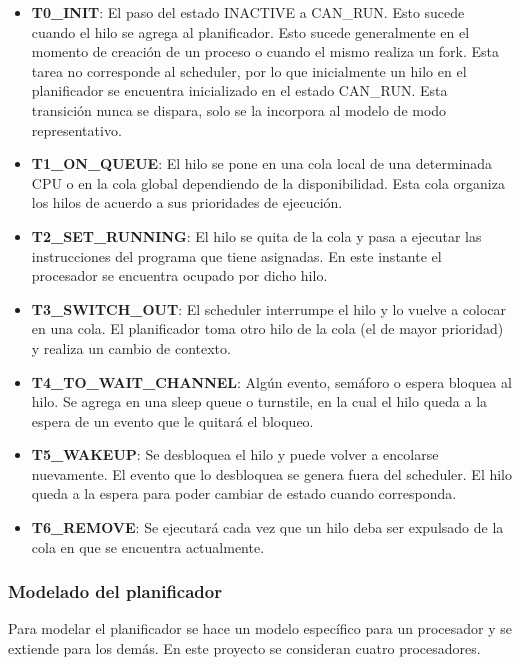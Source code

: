 \begin{itemize}
    \item \textbf{T0\_INIT}: El paso del estado INACTIVE a CAN\_RUN. Esto sucede cuando el hilo se agrega al planificador. Esto sucede generalmente en el momento de creación de un proceso o cuando el mismo realiza un fork. Esta tarea no corresponde al scheduler, por lo que inicialmente un hilo en el planificador se encuentra inicializado en el estado CAN\_RUN. Esta transición nunca se dispara, solo se la incorpora al modelo de modo representativo.
    \item \textbf{T1\_ON\_QUEUE}: El hilo se pone en una cola local de una determinada CPU o en la cola global dependiendo de la disponibilidad. Esta cola organiza los hilos de acuerdo a sus prioridades de ejecución.
    \item \textbf{T2\_SET\_RUNNING}: El hilo se quita de la cola y pasa a ejecutar las instrucciones del programa que tiene asignadas. En este instante el procesador se encuentra ocupado por dicho hilo.
    \item \textbf{T3\_SWITCH\_OUT}: El scheduler interrumpe el hilo y lo vuelve a colocar en una cola. El planificador toma otro hilo de la cola (el de mayor prioridad) y realiza un cambio de contexto.
    \item \textbf{T4\_TO\_WAIT\_CHANNEL}: Algún evento, semáforo o espera bloquea al hilo. Se agrega en una sleep queue o turnstile, en la cual el hilo queda a la espera de un evento que le quitará el bloqueo.
    \item \textbf{T5\_WAKEUP}: Se desbloquea el hilo y puede volver a encolarse nuevamente. El evento que lo desbloquea se genera fuera del scheduler. El hilo queda a la espera para poder cambiar de estado cuando corresponda.
    \item \textbf{T6\_REMOVE}: Se ejecutará cada vez que un hilo deba ser expulsado de la cola en que se encuentra actualmente.
\end{itemize}


\subsubsection{Modelado del planificador}

Para modelar el planificador se hace un modelo específico para un procesador y se extiende para los demás. En este proyecto se consideran cuatro procesadores.


